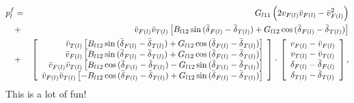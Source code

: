 \documentclass[
  11pt,
  twoside,
  11pt]{article}
\numberwithin{Theorem}{section}
\numberwithin{Definition}{section}
\numberwithin{Lemma}{section}
\numberwithin{Algorithm}{section}
\numberwithin{equation}{section}
\begin{document}
\begin{eqnarray}\label{eqn:horrible}
p_{l}^{f}&=&G_{l11}\left(2v_{F(l)}\bar{v}_{F(l)}-\bar{v}_{F(l)}^{2}\right)\\
&+&
\bar{v}_{F(l)}\bar{v}_{T(l)}
\left[
B_{l12}\sin{}(\bar{\delta{}}_{F(l)}-\bar{\delta{}}_{T(l)})
+G_{l12}\cos{}(\bar{\delta{}}_{F(l)}-\bar{\delta{}}_{T(l)})
\right]\notag\\
&+&
\left[\begin{array}{r}
      \bar{v}_{T(l)}
      \left[
      B_{l12}\sin{}(\bar{\delta{}}_{F(l)}-\bar{\delta{}}_{T(l)})
      +G_{l12}\cos{}(\bar{\delta{}}_{F(l)}-\bar{\delta{}}_{T(l)})
      \right]\\
      \bar{v}_{F(l)}
      \left[
      B_{l12}\sin{}(\bar{\delta{}}_{F(l)}-\bar{\delta{}}_{T(l)})
      +G_{l12}\cos{}(\bar{\delta{}}_{F(l)}-\bar{\delta{}}_{T(l)})
      \right]\\
      \bar{v}_{F(l)}\bar{v}_{T(l)}
      \left[
      B_{l12}\cos{}(\bar{\delta{}}_{F(l)}-\bar{\delta{}}_{T(l)})
      -G_{l12}\sin{}(\bar{\delta{}}_{F(l)}-\bar{\delta{}}_{T(l)})
      \right]\\
      \bar{v}_{F(l)}\bar{v}_{T(l)}
      \left[
      -B_{l12}\cos{}(\bar{\delta{}}_{F(l)}-\bar{\delta{}}_{T(l)})
      +G_{l12}\sin{}(\bar{\delta{}}_{F(l)}-\bar{\delta{}}_{T(l)})
      \right]\\
      \end{array}\right]
\cdot{}
\left[\begin{array}{c}
      v_{F(l)}-\bar{v}_{F(l)}\\
      v_{T(l)}-\bar{v}_{T(l)}\\
      \delta_{F(l)}-\bar{\delta{}}_{F(l)}\\
      \delta_{T(l)}-\bar{\delta{}}_{T(l)}
      \end{array}\right],\notag
\end{eqnarray}
This is a lot of fun!
\clearpage
\end{document}
